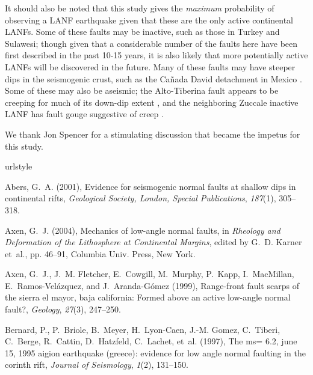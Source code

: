 \documentclass[twocolumn,grl]{AGUTeX}
\begin{document}
\begin{article}
It should also be noted that this study gives the \emph{maximum} probability of observing a LANF earthquake given that these are the only active continental LANFs.  Some of these faults may be inactive, such as those in Turkey and Sulawesi; though given that a considerable number of the faults here have been first described in the past 10-15 years, it is also likely that more potentially active LANFs will be discovered in the future.  Many of these faults may have steeper dips in the seismogenic crust, such as the Ca\~nada David detachment in Mexico \citep{fletcherspelz2009}.  Some of these may also be aseismic; the Alto-Tiberina fault appears to be creeping for much of its down-dip extent \citep{hreinsdottir2009altotib}, and the neighboring Zuccale inactive LANF has fault gouge suggestive of creep \citep{collettiniholdsworth2004}.  


\begin{acknowledgements}
We thank Jon Spencer for a stimulating discussion that became the impetus for this study.
\end{acknowledgements}

\begin{thebibliography}{23}
\providecommand{\natexlab}[1]{#1}
\expandafter\ifx\csname urlstyle\endcsname\relax
  \providecommand{\doi}[1]{doi:\discretionary{}{}{}#1}\else
  \providecommand{\doi}{doi:\discretionary{}{}{}\begingroup
  \urlstyle{rm}\Url}\fi

Abers, G.~A. (2001), Evidence for seismogenic normal faults at shallow dips in
  continental rifts, \textit{Geological Society, London, Special Publications},
  \textit{187}(1), 305--318.

Axen, G.~J. (2004), Mechanics of low-angle normal faults, in \textit{Rheology
  and Deformation of the Lithosphere at Continental Margins}, edited by G.~D.
  Karner et~al., pp. 46--91, Columbia Univ. Press, New York.

Axen, G.~J., J.~M. Fletcher, E.~Cowgill, M.~Murphy, P.~Kapp, I.~MacMillan,
  E.~Ramos-Vel{\'a}zquez, and J.~Aranda-G{\'o}mez (1999), Range-front fault
  scarps of the sierra el mayor, baja california: Formed above an active
  low-angle normal fault?, \textit{Geology}, \textit{27}(3), 247--250.

Bernard, P., P.~Briole, B.~Meyer, H.~Lyon-Caen, J.-M. Gomez, C.~Tiberi,
  C.~Berge, R.~Cattin, D.~Hatzfeld, C.~Lachet, et~al. (1997), The ms= 6.2, june
  15, 1995 aigion earthquake (greece): evidence for low angle normal faulting
  in the corinth rift, \textit{Journal of Seismology}, \textit{1}(2), 131--150.


\end{thebibliography}
\end{article}
\end{document}
